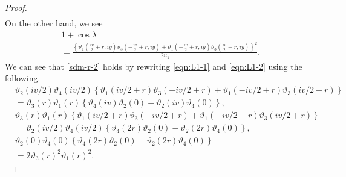 \documentclass[10pt,leqno]{amsart}
\numberwithin{equation}{section}
\begin{document}
\begin{proof}
\begin{equation}
\begin{split}
\end{split}
\end{equation}
On the other hand, we see
\begin{equation}\label{eqn:L1-2}
\begin{split}
&1+\cos\lambda\\
&=\frac{\left\{\vartheta_{1}\left(\frac{iv}{2}+r; iy\right)\vartheta_{3}\left(-\frac{iv}{2}+r; iy\right)+\vartheta_{1}\left(-\frac{iv}{2}+r; iy\right)\vartheta_{3}\left(\frac{iv}{2}+r; iy\right)\right\}^{2}}{2u_{1}}.
\end{split}
\end{equation}
We can see that \eqref{sdm-r-2} holds by rewriting \eqref{eqn:L1-1} and \eqref{eqn:L1-2} using the following.
\begin{equation}
\begin{split}
&\vartheta_{2}\left(iv/2\right)\vartheta_{4}\left(iv/2\right)\left\lbrace\vartheta_{1}\left(iv/2+r\right)\vartheta_{3}\left(-iv/2+r\right)+\vartheta_{1}\left(-iv/2+r\right)\vartheta_{3}\left(iv/2+r\right)\right\rbrace\\
&=\vartheta_{3}\left(r\right)\vartheta_{1}\left(r\right)\left\lbrace\vartheta_{4}\left(iv\right)\vartheta_{2}\left(0\right)+\vartheta_{2}\left(iv\right)\vartheta_{4}\left(0\right)\right\rbrace,\\
&\vartheta_{3}\left(r\right)\vartheta_{1}\left(r\right)\left\lbrace\vartheta_{1}\left(iv/2+r\right)\vartheta_{3}\left(-iv/2+r\right)+\vartheta_{1}\left(-iv/2+r\right)\vartheta_{3}\left(iv/2+r\right)\right\rbrace\\
&=\vartheta_{2}\left(iv/2\right)\vartheta_{4}\left(iv/2\right)\left\lbrace\vartheta_{4}\left(2r\right)\vartheta_{2}\left(0\right)-\vartheta_{2}\left(2r\right)\vartheta_{4}\left(0\right)\right\rbrace,\\
&\vartheta_{2}\left(0\right)\vartheta_{4}\left(0\right)\left\lbrace\vartheta_{4}\left(2r\right)\vartheta_{2}\left(0\right)-\vartheta_{2}\left(2r\right)\vartheta_{4}\left(0\right)\right\rbrace\\
&=2\vartheta_{3}\left(r\right)^{2}\vartheta_{1}\left(r\right)^{2}.
\end{split}
\end{equation}
\end{proof}

\end{document}
